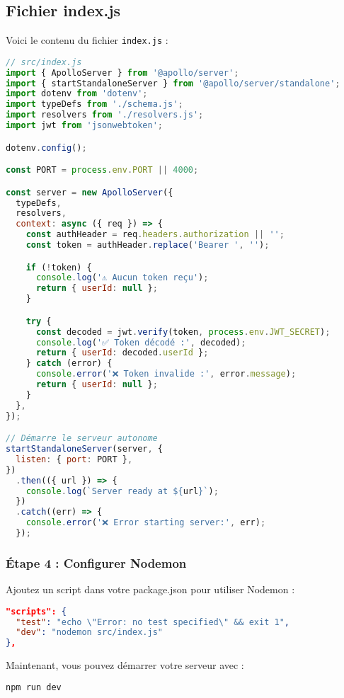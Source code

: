 \documentclass{article}
\begin{document}
\subsection{Fichier index.js}
Voici le contenu du fichier \texttt{index.js} :
\begin{lstlisting}[language=JavaScript]
// src/index.js
import { ApolloServer } from '@apollo/server';
import { startStandaloneServer } from '@apollo/server/standalone';
import dotenv from 'dotenv';
import typeDefs from './schema.js';
import resolvers from './resolvers.js';
import jwt from 'jsonwebtoken';

dotenv.config();

const PORT = process.env.PORT || 4000;

const server = new ApolloServer({
  typeDefs,
  resolvers,
  context: async ({ req }) => {
    const authHeader = req.headers.authorization || '';
    const token = authHeader.replace('Bearer ', '');

    if (!token) {
      console.log('⚠️ Aucun token reçu');
      return { userId: null };
    }

    try {
      const decoded = jwt.verify(token, process.env.JWT_SECRET);
      console.log('✅ Token décodé :', decoded);
      return { userId: decoded.userId };
    } catch (error) {
      console.error('❌ Token invalide :', error.message);
      return { userId: null };
    }
  },
});

// Démarre le serveur autonome
startStandaloneServer(server, {
  listen: { port: PORT },
})
  .then(({ url }) => {
    console.log(`Server ready at ${url}`);
  })
  .catch((err) => {
    console.error('❌ Error starting server:', err);
  });
\end{lstlisting}








\subsubsection{Étape 4 : Configurer Nodemon}
Ajoutez un script dans votre package.json pour utiliser Nodemon :
\begin{lstlisting}[language=json]
"scripts": {
  "test": "echo \"Error: no test specified\" && exit 1",
  "dev": "nodemon src/index.js"
},
\end{lstlisting}

Maintenant, vous pouvez démarrer votre serveur avec :
\begin{lstlisting}[language=bash]
npm run dev
\end{lstlisting}
\end{document}
